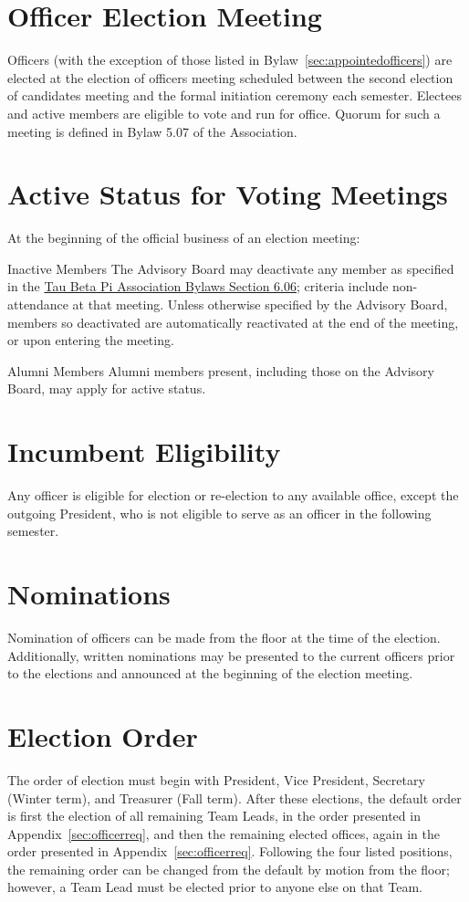 \section{Officer Election Meeting}\label{sec:elecMeeting} Officers (with the exception of those listed in Bylaw~\ref{sec:appointedofficers}) are elected at the election 
of officers meeting scheduled between the second election of candidates meeting and the formal initiation ceremony each semester. Electees and active members are eligible to vote and run for office. Quorum for such a meeting is defined in Bylaw 5.07 of the Association.
\section{Active Status for Voting Meetings}\label{sec:elecQuorum} At the beginning of the official business of an election meeting:
\begin{enumsubsection}
\item*{Inactive Members} The Advisory Board may deactivate any member as specified in the  \href{http://www.tbp.org/off/ConstBylaw.pdf}{Tau Beta Pi Association Bylaws Section 6.06}; criteria include non-attendance at that meeting. Unless otherwise specified by the Advisory Board,
members so deactivated are automatically reactivated at the end of the meeting, or upon entering the meeting.
\item*{Alumni Members} Alumni members present, including those on the Advisory Board, may apply for active status.
\end{enumsubsection}
\section{Incumbent Eligibility} Any officer is eligible for election or re-election to any available office, except the outgoing President, who is not eligible to serve as an officer in the following semester.
\section{Nominations} Nomination of officers can be made from the floor at the time of the election.  Additionally, written nominations may be presented to the current officers prior to the elections and announced at the beginning of the election meeting.
\section{Election Order} The order of election must begin with President, Vice President, Secretary (Winter term), and Treasurer (Fall term). After these elections, the default order is first the election of all remaining Team Leads, in the order presented in Appendix~\ref{sec:officerreq}, and then the remaining elected offices, again in the order presented in Appendix~\ref{sec:officerreq}. Following the four listed positions, the remaining order can be changed from the default by motion from the floor; however, a Team Lead must be elected prior to anyone else on that Team.
